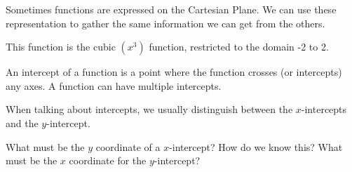 \begin{presentation}
\begin{example}
Sometimes functions are expressed on the Cartesian Plane. We can use these representation to gather the same information we can get from the others. 
\begin{center}
\end{center}


This function is the cubic $(x^3)$ function, restricted to the domain -2 to 2. 


\end{example}
\end{presentation}

\begin{presentation}
\begin{defn}[Intercepts]\label{Intercept}
	An intercept of a function is a point where the function crosses (or intercepts) any axes. A function can have multiple intercepts.
\end{defn}
\end{presentation}

When talking about intercepts, we usually distinguish between the $x$-intercepts and the $y$-intercept.

\begin{prblm}
What must be the $y$ coordinate of a $x$-intercept? How do we know this? What must be the $x$ coordinate for the $y$-intercept?	
\vspace{4cm}
\end{prblm}

